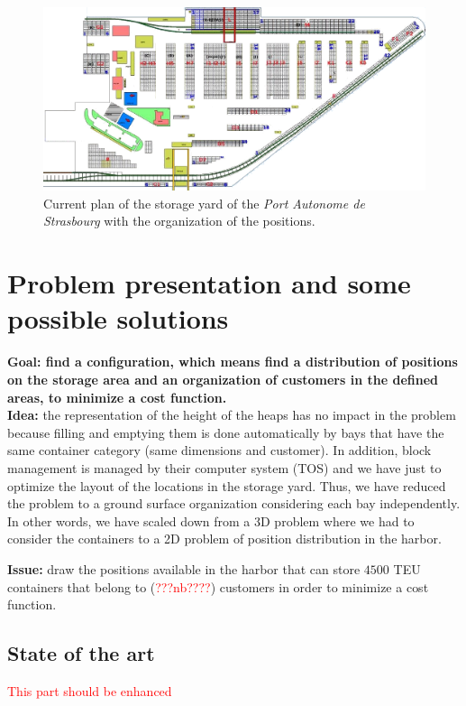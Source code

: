 \documentclass{article}
\newcommand{\ls}[1]{\textcolor{red}{#1}}
\newcommand{\PAS}{\emph{Port Autonome de Strasbourg }}
\begin{document}
\begin{figure}[!htb]
\centering
\includegraphics[width=\linewidth]{images/Plan_Terminal.png}
\caption{Current plan of the storage yard of the \PAS with the organization of the positions.}
\label{fig:pas_config}
\end{figure}




\section{Problem presentation and some possible solutions}

\textbf{Goal: find a configuration, which means find a distribution of positions on the storage area and an organization of customers in the defined areas, to minimize a cost function.} \\

\noindent
\textbf{Idea:} the representation of the height of the heaps has no impact in the problem because filling and emptying them is done automatically by bays that have the same container category (same dimensions and customer).
In addition, block management is managed by their computer system (TOS) and we have just to optimize the layout of the locations in the storage yard.
Thus, we have reduced the problem to a ground surface organization considering each bay independently. 
In other words, we have scaled down from a 3D problem where we had to consider the containers to a 2D problem of position distribution in the harbor.


\noindent
{\bf Issue: } draw the positions available in the harbor that can store $ 4500 $ TEU containers that belong to (\ls{???nb????}) customers in order to minimize a cost function.


\subsection{State of the art} 
\ls{This part should be enhanced}
\end{document}
